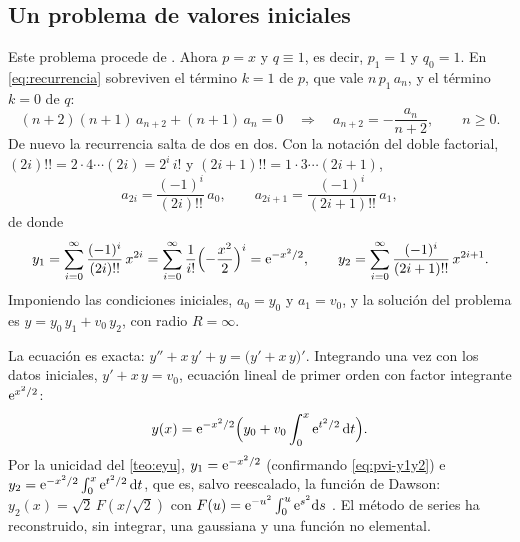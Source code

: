 

\subsection{Un problema de valores iniciales}\label{sec:pvi}

\begin{ejemplo}[$y''+x\,y'+y=0$, $y(0)=y_0$, $y'(0)=v_0$]\label{ej:pvi}
Este problema procede de \cite{TEMAV}. Ahora $p=x$ y $q\equiv1$, es decir,
$p_1=1$ y $q_0=1$. En \eqref{eq:recurrencia} sobreviven el término $k=1$ de
$p$, que vale $n\,p_1\,a_n$, y el término $k=0$ de $q$:
\begin{equation}\label{eq:rec-pvi}
  (n+2)(n+1)\,a_{n+2}+(n+1)\,a_n=0
  \quad\Longrightarrow\quad
  a_{n+2}=-\frac{a_n}{n+2},\qquad n\ge0 .
\end{equation}
De nuevo la recurrencia salta de dos en dos. Con la notación del doble
factorial, $(2i)!!=2\cdot4\cdots(2i)=2^{i}\,i!$ y
$(2i+1)!!=1\cdot3\cdots(2i+1)$,
\begin{equation}\label{eq:coef-pvi}
  a_{2i}=\frac{(-1)^{i}}{(2i)!!}\,a_0,\qquad
  a_{2i+1}=\frac{(-1)^{i}}{(2i+1)!!}\,a_1 ,
\end{equation}
de donde
\begin{equation}\label{eq:pvi-y1y2}
  y_1=\sum_{i=0}^{\infty}\frac{(-1)^{i}}{(2i)!!}\,x^{2i}
     =\sum_{i=0}^{\infty}\frac{1}{i!}\Bigl(-\frac{x^{2}}{2}\Bigr)^{i}
     =\mathrm{e}^{-x^{2}/2},
  \qquad
  y_2=\sum_{i=0}^{\infty}\frac{(-1)^{i}}{(2i+1)!!}\,x^{2i+1}.
\end{equation}
Imponiendo las condiciones iniciales, $a_0=y_0$ y $a_1=v_0$, y la solución
del problema es $y=y_0\,y_1+v_0\,y_2$, con radio $R=\infty$.
\end{ejemplo}

\begin{observacion}\label{obs:pvi-exacta}
La ecuación es exacta: $y''+x\,y'+y=\bigl(y'+x\,y\bigr)'$. Integrando una vez
con los datos iniciales, $y'+x\,y=v_0$, ecuación lineal de primer orden con
factor integrante $\mathrm{e}^{x^{2}/2}$:
\[
  y(x)=\mathrm{e}^{-x^{2}/2}\Bigl(y_0+v_0\int_0^{x}\mathrm{e}^{t^{2}/2}\,\mathrm{d} t\Bigr).
\]
Por la unicidad del \cref{teo:eyu}, $y_1=\mathrm{e}^{-x^{2}/2}$ (confirmando
\eqref{eq:pvi-y1y2}) e
$y_2=\mathrm{e}^{-x^{2}/2}\int_0^{x}\mathrm{e}^{t^{2}/2}\,\mathrm{d} t$, que es, salvo
reescalado, la función de Dawson: $y_2(x)=\sqrt2\,F(x/\sqrt2)$ con
$F(u)=\mathrm{e}^{-u^{2}}\int_0^{u}\mathrm{e}^{s^{2}}\mathrm{d} s$ \cite[§7.2]{DLMF}. El método
de series ha reconstruido, sin integrar, una gaussiana y una función no
elemental.
\end{observacion}

